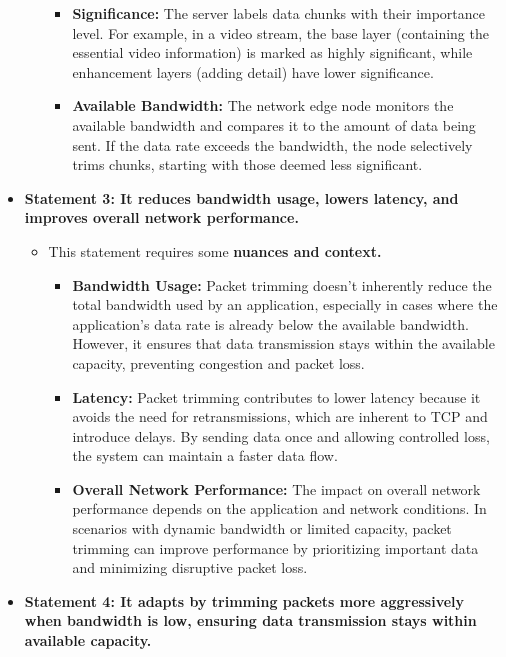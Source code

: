 \documentclass[
]{article}
\begin{document}
\begin{itemize}
\begin{itemize}
\begin{itemize}
    \item
      \textbf{Significance:} The server labels data chunks with their
      importance level. For example, in a video stream, the base layer
      (containing the essential video information) is marked as highly
      significant, while enhancement layers (adding detail) have lower
      significance.
    \item
      \textbf{Available Bandwidth:} The network edge node monitors the
      available bandwidth and compares it to the amount of data being
      sent. If the data rate exceeds the bandwidth, the node selectively
      trims chunks, starting with those deemed less significant.
    \end{itemize}
  \end{itemize}
\item
  \textbf{Statement 3: It reduces bandwidth usage, lowers latency, and
  improves overall network performance.}

  \begin{itemize}
  
  \item
    This statement requires some \textbf{nuances and context.}

    \begin{itemize}
    
    \item
      \textbf{Bandwidth Usage:} Packet trimming doesn't inherently
      reduce the total bandwidth used by an application, especially in
      cases where the application's data rate is already below the
      available bandwidth. However, it ensures that data transmission
      stays within the available capacity, preventing congestion and
      packet loss.
    \item
      \textbf{Latency:} Packet trimming contributes to lower latency
      because it avoids the need for retransmissions, which are inherent
      to TCP and introduce delays. By sending data once and allowing
      controlled loss, the system can maintain a faster data flow.
    \item
      \textbf{Overall Network Performance:} The impact on overall
      network performance depends on the application and network
      conditions. In scenarios with dynamic bandwidth or limited
      capacity, packet trimming can improve performance by prioritizing
      important data and minimizing disruptive packet loss.
    \end{itemize}
  \end{itemize}
\item
  \textbf{Statement 4: It adapts by trimming packets more aggressively
  when bandwidth is low, ensuring data transmission stays within
  available capacity.}


\end{itemize}
\end{document}
